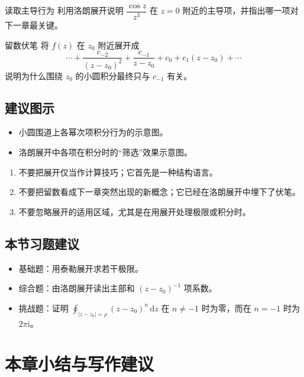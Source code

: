 \begin{lizi}{读取主导行为}{}
利用洛朗展开说明 $\dfrac{\cos z}{z^3}$ 在 $z=0$ 附近的主导项，并指出哪一项对下一章最关键。
\end{lizi}

\begin{lizi}{留数伏笔}{}
将 $f(z)$ 在 $z_0$ 附近展开成
\[
    \cdots + \frac{c_{-2}}{(z-z_0)^2} + \frac{c_{-1}}{z-z_0} + c_0 + c_1 (z-z_0) + \cdots
\]
说明为什么围绕 $z_0$ 的小圆积分最终只与 $c_{-1}$ 有关。
\end{lizi}

\subsection*{建议图示}
\begin{itemize}
    \item 小圆围道上各幂次项积分行为的示意图。
    \item 洛朗展开中各项在积分时的``筛选''效果示意图。
\end{itemize}

\begin{jinshi}[本节易错点]
\begin{enumerate}
    \item 不要把展开仅当作计算技巧；它首先是一种结构语言。
    \item 不要把留数看成下一章突然出现的新概念；它已经在洛朗展开中埋下了伏笔。
    \item 不要忽略展开的适用区域，尤其是在用展开处理极限或积分时。
\end{enumerate}
\end{jinshi}

\subsection*{本节习题建议}
\begin{itemize}
    \item 基础题：用泰勒展开求若干极限。
    \item 综合题：由洛朗展开读出主部和 $(z-z_0)^{-1}$ 项系数。
    \item 挑战题：证明 $\oint_{|z-z_0|=\rho} (z-z_0)^n\,\mathrm{d}z$ 在 $n\neq -1$ 时为零，而在 $n=-1$ 时为 $2\pi \mathrm{i}$。
\end{itemize}

\section{本章小结与写作建议}

